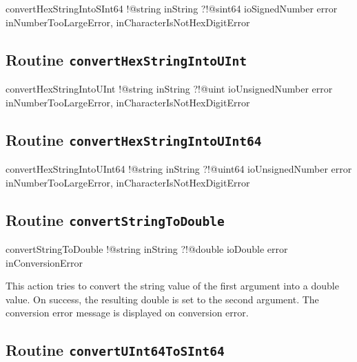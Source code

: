 {\begin{galgascode}
convertHexStringIntoSInt64 !@string inString
                           ?!@sint64 ioSignedNumber
                           error inNumberTooLargeError,
                                 inCharacterIsNotHexDigitError
\end{galgascode}

\subsection{Routine \texttt{convertHexStringIntoUInt}}

\begin{galgascode}
convertHexStringIntoUInt !@string inString
                         ?!@uint ioUnsignedNumber
                         error inNumberTooLargeError,
                               inCharacterIsNotHexDigitError
\end{galgascode}

\subsection{Routine \texttt{convertHexStringIntoUInt64}}

\begin{galgascode}
convertHexStringIntoUInt64 !@string inString
                           ?!@uint64 ioUnsignedNumber
                           error inNumberTooLargeError,
                                 inCharacterIsNotHexDigitError
\end{galgascode}

\subsection{Routine \texttt{convertStringToDouble}}

\begin{galgascode}
convertStringToDouble !@string inString
                      ?!@double ioDouble
                      error inConversionError
\end{galgascode}

This action tries to convert the string value of the first argument into a double value. On success, the resulting double is set to the second argument. The conversion error message is displayed on conversion error.

\subsection{Routine \texttt{convertUInt64ToSInt64}}

}
